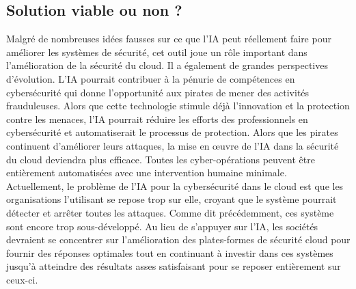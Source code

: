 \documentclass[a4paper, 12pt]{article}
\begin{document}
    \subsection{Solution viable ou non ?}
      Malgré de nombreuses idées fausses sur ce que l'IA peut réellement
      faire pour améliorer les systèmes de sécurité, cet outil joue un rôle
      important dans l'amélioration de la sécurité du cloud. Il a également de
      grandes perspectives d’évolution. L’IA pourrait contribuer à la pénurie de
      compétences en cybersécurité qui donne l'opportunité aux pirates de mener
      des activités frauduleuses. Alors que cette technologie stimule déjà
      l'innovation et la protection contre les menaces, l'IA pourrait réduire
      les efforts des professionnels en cybersécurité et automatiserait le
      processus de protection. Alors que les pirates continuent d'améliorer
      leurs attaques, la mise en œuvre de l'IA dans la sécurité du cloud
      deviendra plus efficace. Toutes les cyber-opérations peuvent être
      entièrement automatisées avec une intervention humaine minimale. \\

      Actuellement, le problème de l’IA pour la cybersécurité dans le cloud est
      que les organisations l’utilisant se repose trop sur elle, croyant que le
      système pourrait détecter et arrêter toutes les attaques. Comme dit
      précédemment, ces système sont encore trop sous-développé. Au lieu de
      s'appuyer sur l’IA, les sociétés devraient se concentrer sur
      l'amélioration des plates-formes de sécurité cloud pour fournir des
      réponses optimales tout en continuant à investir dans ces systèmes jusqu’à
      atteindre des résultats asses satisfaisant pour se reposer entièrement sur
      ceux-ci.
\end{document}
